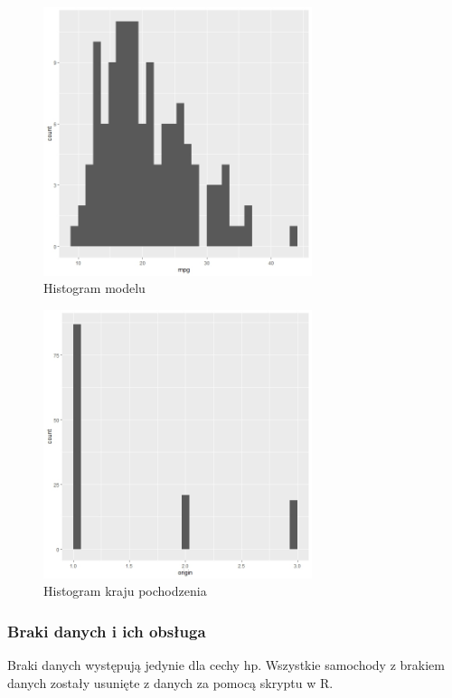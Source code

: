 \documentclass{article}
\begin{document}
            \begin{figure}[H]
                \caption{Histogram modelu}
                \centering
                \includegraphics[width=0.7\textwidth]{../histograms/mpg_hist.jpeg}
            \end{figure}
            \begin{figure}[H]
                \caption{Histogram kraju pochodzenia}
                \includegraphics[width=0.7\textwidth]{../histograms/origin_hist.jpeg}
            \end{figure}
            
            
            
        \subsubsection*{Braki danych i ich obsługa}
        Braki danych występują jedynie dla cechy hp. Wszystkie samochody z brakiem danych zostały usunięte z danych za pomocą skryptu w R.
\end{document}
